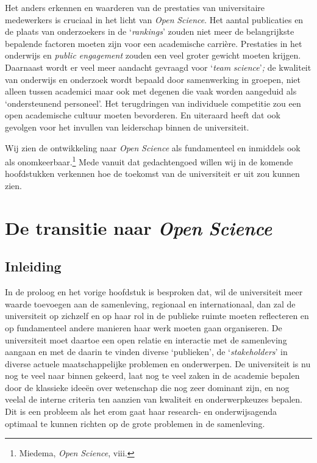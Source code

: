 \documentclass[smallauthor, chapterhaspagenum, nochapterinheader, pagenuminheader,  bigchapnum,medium2, tocpages, garamond, titleinheader]{jote-book}
\begin{document}
	Het anders erkennen en waarderen van de prestaties van universitaire medewerkers is cruciaal in het licht van \emph{Open }\emph{Science}. Het aantal publicaties en de plaats van onderzoekers in de ‘\emph{rankings}' zouden niet meer de belangrijkste bepalende factoren moeten zijn voor een academische carrière. Prestaties in het onderwijs en \emph{public engagement} zouden een veel groter gewicht moeten krijgen. Daarnaast wordt er veel meer aandacht gevraagd voor ‘\emph{team}\emph{ }\emph{science}'\emph{; }de kwaliteit van onderwijs en onderzoek wordt bepaald door samenwerking in groepen, niet alleen tussen academici maar ook met degenen die vaak worden aangeduid als ‘ondersteunend personeel'. Het terugdringen van individuele competitie zou een open academische cultuur moeten bevorderen. En uiteraard heeft dat ook gevolgen voor het invullen van leiderschap binnen de universiteit.







	Wij zien de ontwikkeling naar \emph{Open }\emph{Science} als fundamenteel en inmiddels ook als onomkeerbaar.\footnote{Miedema, \emph{Open }\emph{Science}, viii.} Mede vanuit dat gedachtengoed willen wij in de komende hoofdstukken verkennen hoe de toekomst van de universiteit er uit zou kunnen zien.







	\chapter{De transitie naar \emph{Open }\emph{Science} }



	\section{Inleiding }



	In de proloog en het vorige hoofdstuk is besproken dat, wil de universiteit meer waarde toevoegen aan de samenleving, regionaal en internationaal, dan zal de universiteit op zichzelf en op haar rol in de publieke ruimte moeten reflecteren en op fundamenteel andere manieren haar werk moeten gaan organiseren. De universiteit moet daartoe een open relatie en interactie met de samenleving aangaan en met de daarin te vinden diverse ‘publieken', de ‘\emph{stakeholders}' in diverse actuele maatschappelijke problemen en onderwerpen. De universiteit is nu nog te veel naar binnen gekeerd, laat nog te veel zaken in de academie bepalen door de klassieke ideeën over wetenschap die nog zeer dominant zijn, en nog veelal de interne criteria ten aanzien van kwaliteit en onderwerpkeuzes bepalen. Dit is een probleem als het erom gaat haar research- en onderwijsagenda optimaal te kunnen richten op de grote problemen in de samenleving.
\end{document}
